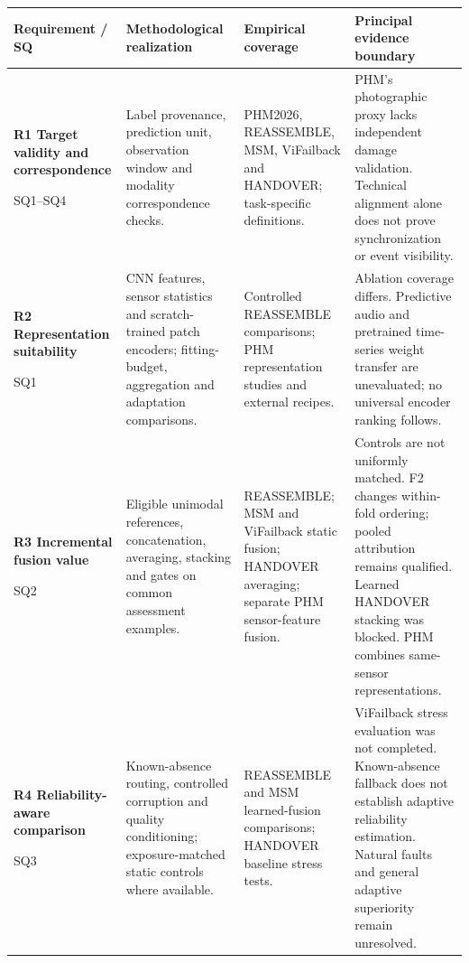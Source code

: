\begingroup
\singlespacing
\fontsize{9bp}{11.5bp}\selectfont
\setlength{\tabcolsep}{4bp}
\renewcommand{\arraystretch}{1.12}
\begin{tabularx}{\linewidth}{@{}>{\raggedright\arraybackslash}p{73bp}>{\raggedright\arraybackslash}p{111bp}>{\raggedright\arraybackslash}p{100bp}>{\raggedright\arraybackslash}X@{}}
\toprule
\textbf{Requirement / SQ} & \textbf{Methodological realization} & \textbf{Empirical coverage} & \textbf{Principal evidence boundary} \\
\midrule
\textbf{R1 Target validity and correspondence}\par SQ1--SQ4 &
Label provenance, prediction unit, observation window and modality correspondence checks. &
PHM2026, REASSEMBLE, MSM, ViFailback and HANDOVER; task-specific definitions. &
PHM's photographic proxy lacks independent damage validation. Technical alignment alone does not prove synchronization or event visibility. \\
\addlinespace[7bp]
\textbf{R2 Representation suitability}\par SQ1 &
CNN features, sensor statistics and scratch-trained patch encoders; fitting-budget, aggregation and adaptation comparisons. &
Controlled REASSEMBLE comparisons; PHM representation studies and external recipes. &
Ablation coverage differs. Predictive audio and pretrained time-series weight transfer are unevaluated; no universal encoder ranking follows. \\
\addlinespace[7bp]
\textbf{R3 Incremental fusion value}\par SQ2 &
Eligible unimodal references, concatenation, averaging, stacking and gates on common assessment examples. &
REASSEMBLE; MSM and ViFailback static fusion; HANDOVER averaging; separate PHM sensor-feature fusion. &
Controls are not uniformly matched. F2 changes within-fold ordering; pooled attribution remains qualified. Learned HANDOVER stacking was blocked. PHM combines same-sensor representations. \\
\addlinespace[7bp]
\textbf{R4 Reliability-aware comparison}\par SQ3 &
Known-absence routing, controlled corruption and quality conditioning; exposure-matched static controls where available. &
REASSEMBLE and MSM learned-fusion comparisons; HANDOVER baseline stress tests. &
ViFailback stress evaluation was not completed. Known-absence fallback does not establish adaptive reliability estimation. Natural faults and general adaptive superiority remain unresolved. \\

\end{tabularx}

